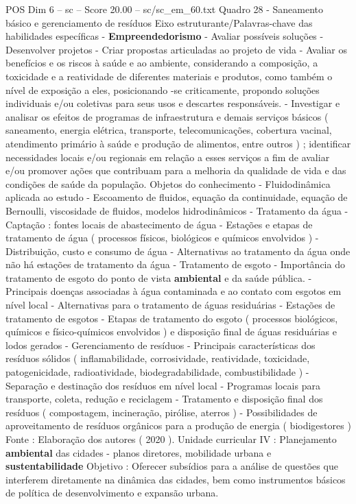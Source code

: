 \begin{textsample}{POS Dim 6 – sc – Score 20.00 – sc/sc\_em\_60.txt}
Quadro 28 - Saneamento básico e gerenciamento de resíduos Eixo estruturante/Palavras-chave das habilidades específicas - \textbf{Empreendedorismo} - Avaliar possíveis soluções - Desenvolver projetos - Criar propostas articuladas ao projeto de vida - Avaliar os benefícios e os riscos à saúde e ao ambiente, considerando a composição, a toxicidade e a reatividade de diferentes materiais e produtos, como também o nível de exposição a eles, posicionando -se criticamente, propondo soluções individuais e/ou coletivas para seus usos e descartes responsáveis. - Investigar e analisar os efeitos de programas de infraestrutura e demais serviços básicos ( saneamento, energia elétrica, transporte, telecomunicações, cobertura vacinal, atendimento primário à saúde e produção de alimentos, entre outros ) ; identificar necessidades locais e/ou regionais em relação a esses serviços a fim de avaliar e/ou promover ações que contribuam para a melhoria da qualidade de vida e das condições de saúde da população.
Objetos do conhecimento - Fluidodinâmica aplicada ao estudo - Escoamento de fluidos, equação da continuidade, equação de Bernoulli, viscosidade de fluidos, modelos hidrodinâmicos - Tratamento da água - Captação : fontes locais de abastecimento de água - Estações e etapas de tratamento de água ( processos físicos, biológicos e químicos envolvidos ) - Distribuição, custo e consumo de água - Alternativas ao tratamento da água onde não há estações de tratamento da água - Tratamento de esgoto - Importância do tratamento de esgoto do ponto de vista \textbf{ambiental} e da saúde pública. - Principais doenças associadas à água contaminada e ao contato com esgotos em nível local - Alternativas para o tratamento de águas residuárias - Estações de tratamento de esgotos - Etapas de tratamento do esgoto ( processos biológicos, químicos e físico-químicos envolvidos ) e disposição final de águas residuárias e lodos gerados - Gerenciamento de resíduos - Principais características dos resíduos sólidos ( inflamabilidade, corrosividade, reatividade, toxicidade, patogenicidade, radioatividade, biodegradabilidade, combustibilidade ) - Separação e destinação dos resíduos em nível local - Programas locais para transporte, coleta, redução e reciclagem - Tratamento e disposição final dos resíduos ( compostagem, incineração, pirólise, aterros ) - Possibilidades de aproveitamento de resíduos orgânicos para a produção de energia ( biodigestores ) Fonte : Elaboração dos autores ( 2020 ).
Unidade curricular IV : Planejamento \textbf{ambiental} das cidades - planos diretores, mobilidade urbana e \textbf{sustentabilidade} Objetivo : Oferecer subsídios para a análise de questões que interferem diretamente na dinâmica das cidades, bem como instrumentos básicos de política de desenvolvimento e expansão urbana.

\end{textsample}
